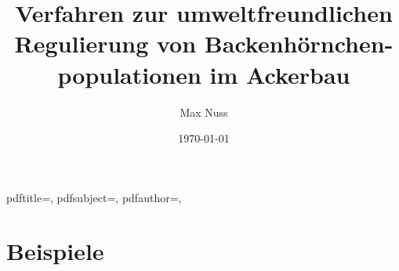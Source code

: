 

\subject{Bachelor-Thesis}
\title{Verfahren zur umweltfreundlichen Regulierung von Backenhörnchen- populationen im Ackerbau}
\author{Max Nuss}
\publishers{Hochschule Mannheim,\newline Fakultät für Landwirtschaftstechnik}
\date{\today}

\makeatletter
\hypersetup
{
	pdftitle={\@title},
	pdfsubject={\@subject},
	pdfauthor={\@author, \@publishers}
}
\makeatother



	


		
		
		

		\clearpage
		
		\clearpage


	

	\chapter{Beispiele}

		
		
		
		

	\appendix
	
	
	
	
	


